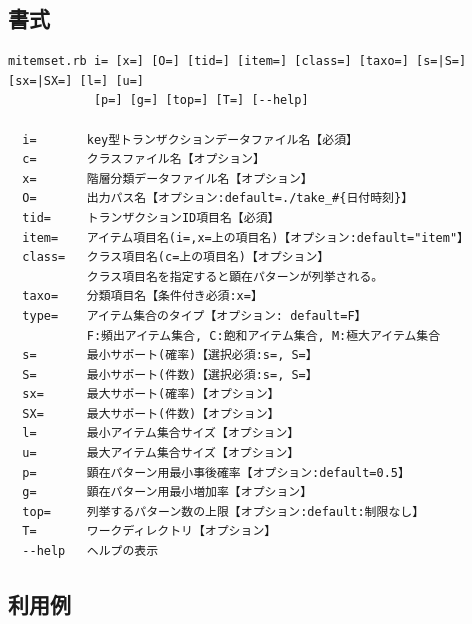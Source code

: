 \subsection{書式}
\begin{verbatim}
mitemset.rb i= [x=] [O=] [tid=] [item=] [class=] [taxo=] [s=|S=] [sx=|SX=] [l=] [u=]
            [p=] [g=] [top=] [T=] [--help]

  i=       key型トランザクションデータファイル名【必須】
  c=       クラスファイル名【オプション】
  x=       階層分類データファイル名【オプション】
  O=       出力パス名【オプション:default=./take_#{日付時刻}】
  tid=     トランザクションID項目名【必須】
  item=    アイテム項目名(i=,x=上の項目名)【オプション:default="item"】
  class=   クラス項目名(c=上の項目名)【オプション】
           クラス項目名を指定すると顕在パターンが列挙される。
  taxo=    分類項目名【条件付き必須:x=】
  type=    アイテム集合のタイプ【オプション: default=F】
           F:頻出アイテム集合, C:飽和アイテム集合, M:極大アイテム集合
  s=       最小サポート(確率)【選択必須:s=, S=】
  S=       最小サポート(件数)【選択必須:s=, S=】
  sx=      最大サポート(確率)【オプション】
  SX=      最大サポート(件数)【オプション】
  l=       最小アイテム集合サイズ【オプション】
  u=       最大アイテム集合サイズ【オプション】
  p=       顕在パターン用最小事後確率【オプション:default=0.5】
  g=       顕在パターン用最小増加率【オプション】
  top=     列挙するパターン数の上限【オプション:default:制限なし】
  T=       ワークディレクトリ【オプション】
  --help   ヘルプの表示
\end{verbatim}


\subsection{利用例}


